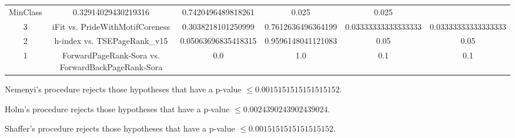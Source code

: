 \documentclass[a4paper,10pt]{article}
\begin{document}
\begin{landscape}
\begin{table}[!htp]
\begin{tabular}{cccccc}
MinClass&0.32914029430219316&0.7420496489818261&0.025&0.025\\3&iFit vs. PrideWithMotifCoreness&0.3038218101250999&0.7612636496364199&0.03333333333333333&0.03333333333333333\\2&h-index vs. TSEPageRank_v15&0.05063696835418315&0.9596148041121083&0.05&0.05\\1&ForwardPageRank-Sora vs. ForwardBackPageRank-Sora&0.0&1.0&0.1&0.1\\\hline
\end{tabular}
\end{table}
Nemenyi's procedure rejects those hypotheses that have a p-value $\le0.0015151515151515152$.


Holm's procedure rejects those hypotheses that have a p-value $\le0.0024390243902439024$.


Shaffer's procedure rejects those hypotheses that have a p-value $\le0.0015151515151515152$.



\end{landscape}
\end{document}

